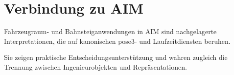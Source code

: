 \section{Verbindung zu AIM}

\begin{summary}
Fahrzeugraum- und Bahnsteiganwendungen in AIM sind nachgelagerte
Interpretationen, die auf kanonischen pose3- und Laufzeitdiensten beruhen.

Sie zeigen praktische Entscheidungsunterstützung und wahren zugleich die
Trennung zwischen Ingenieurobjekten und Repräsentationen.
\end{summary}
